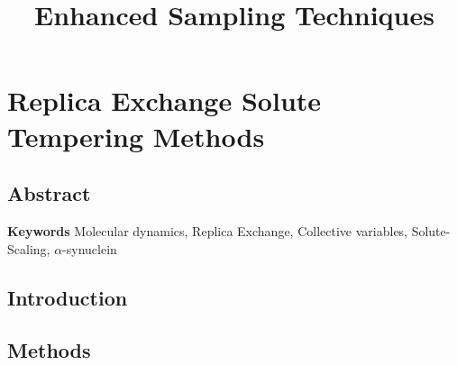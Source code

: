 \documentclass{memoir}
\title{Enhanced Sampling Techniques}
\begin{document}
\date{}

\maketitle

\tableofcontents

\chapter{Replica Exchange Solute Tempering Methods}

\section{Abstract}


\textbf{Keywords} Molecular dynamics, Replica Exchange, Collective variables, Solute-Scaling, $\alpha$-synuclein

\section{Introduction}

\begin{adjustwidth}{2in}{0in}
    




\end{adjustwidth}
\section{Methods}
\begin{adjustwidth}{2in}{0in}



\end{adjustwidth}


\end{document}
